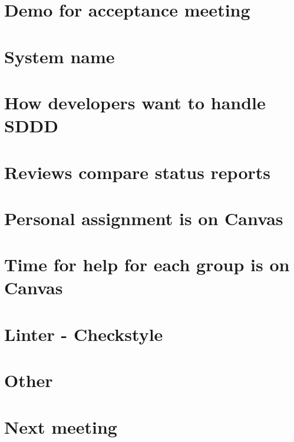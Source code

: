 \documentclass{article}
\begin{document}
\begin{flushleft}
\section{Demo for acceptance meeting}
\section{System name}
\section{How developers want to handle SDDD}
\section{Reviews compare status reports}
\section{Personal assignment is on Canvas}
\section{Time for help for each group is on Canvas}
\section{Linter - Checkstyle}

\section{Other}
\section{Next meeting}
 


\end{flushleft}
\end{document}
